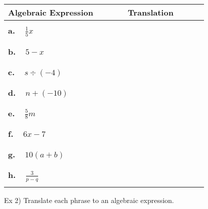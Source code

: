\documentclass{ximera}
\begin{document}
\begin{tabular}{l|c}
Algebraic Expression & $~~~~~~~~~~~~~~~$Translation$~~~~~~~~~~~~~~~$\\
\hline
$~$\\
\textbf{a.} $~~~~\frac{1}{5}x$ & $~$\\
$~$\\
\hline

$~$\\
\textbf{b.} $~~~~5-x$ & $~$\\
$~$\\
\hline

$~$\\
\textbf{c.} $~~~~s\div(-4)$ & $~$\\
$~$\\
\hline

$~$\\
\textbf{d.} $~~~~n+(-10)$ & $~$\\
$~$\\
\hline

$~$\\
\textbf{e.} $~~~~\frac{5}{8}m$ & $~$\\
$~$\\
\hline
$~$\\
\textbf{f.} $~~~~6x-7$ & $~$\\
$~$\\
\hline
$~$\\

\textbf{g.} $~~~~10(a+b)$ & $~$\\
$~$\\
\hline
$~$\\

\textbf{h.} $~~~~\frac{3}{p-q}$ & $~$\\
$~$\\
\end{tabular}



\pagebreak

\noindent Ex 2) Translate each phrase to an algebraic expression.

$~$
\end{document}
